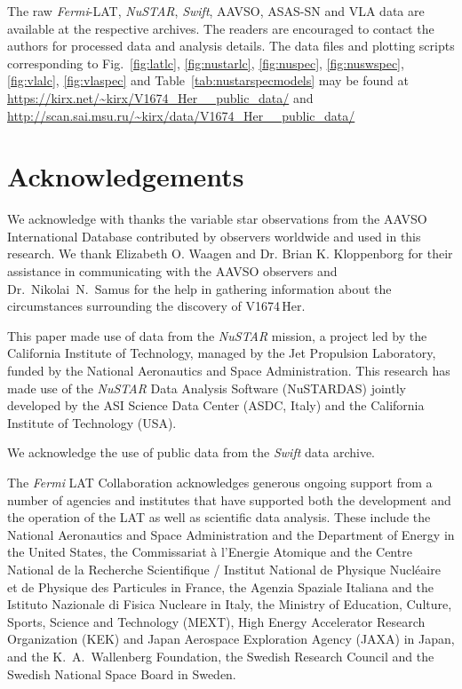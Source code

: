 \documentclass[a4paper,fleqn,usenatbib]{mnras}
\newcommand{\nova}{V1674\,Her}
\newcommand{\fermilat}{\emph{Fermi}-LAT}
\begin{document}
The raw \fermilat{}, {\em NuSTAR}, {\em Swift}, AAVSO, ASAS-SN and VLA data are
available at the respective archives. The readers are encouraged to contact the authors for processed data and analysis details. 
The data files and plotting scripts corresponding 
to Fig.~\ref{fig:latlc}, \ref{fig:nustarlc}, \ref{fig:nuspec},
\ref{fig:nuswspec}, \ref{fig:vlalc}, \ref{fig:vlaspec} and Table~\ref{tab:nustarspecmodels}
may be found at 
\url{https://kirx.net/~kirx/V1674_Her__public_data/}
and 
\url{http://scan.sai.msu.ru/~kirx/data/V1674_Her__public_data/}

\section*{Acknowledgements}
We acknowledge with thanks the variable star observations from the AAVSO International Database contributed by observers worldwide and used in this research. 
%
We thank  
Elizabeth O. Waagen and Dr. Brian K. Kloppenborg for their assistance in 
communicating with the AAVSO observers and 
%
Dr.~Nikolai~N.~Samus for the help in gathering information about the
circumstances surrounding the discovery of \nova{}. 

This paper made use of data from the {\em NuSTAR} mission, a project led by the California Institute of Technology, 
managed by the Jet Propulsion Laboratory, funded by the National Aeronautics and Space Administration.
This research has made use of the {\em NuSTAR} Data Analysis Software (NuSTARDAS) jointly developed by 
the ASI Science Data Center (ASDC, Italy) and the California Institute of Technology (USA).

We acknowledge the use of public data from the {\em Swift} data archive.

The \textit{Fermi} LAT Collaboration acknowledges generous ongoing support
from a number of agencies and institutes that have supported both the
development and the operation of the LAT as well as scientific data analysis.
These include the National Aeronautics and Space Administration and the
Department of Energy in the United States, the Commissariat \`a l'Energie Atomique
and the Centre National de la Recherche Scientifique / Institut National de Physique
Nucl\'eaire et de Physique des Particules in France, the Agenzia Spaziale Italiana
and the Istituto Nazionale di Fisica Nucleare in Italy, the Ministry of Education,
Culture, Sports, Science and Technology (MEXT), High Energy Accelerator Research
Organization (KEK) and Japan Aerospace Exploration Agency (JAXA) in Japan, and
the K.~A.~Wallenberg Foundation, the Swedish Research Council and the
Swedish National Space Board in Sweden.
 
\end{document}
